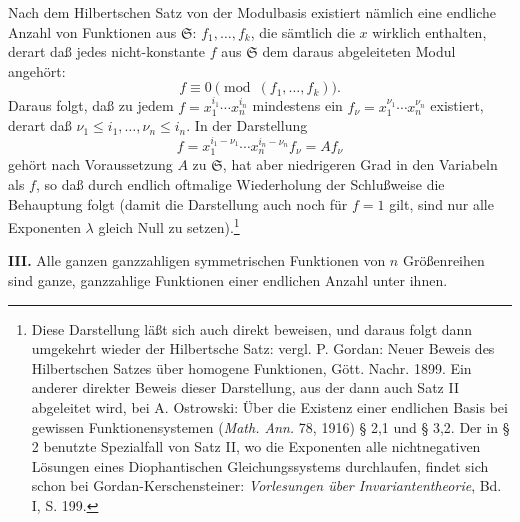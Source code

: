 \documentclass[11pt]{article}
\providecommand{\frS}{\mathfrak S}
\begin{document}
Nach dem Hilbertschen Satz von der Modulbasis existiert nämlich eine endliche Anzahl von Funktionen aus \(\frS\): \(f_1,\ldots,f_k\), die sämtlich die \(x\) wirklich enthalten, derart daß jedes nicht-konstante \(f\) aus \(\frS\) dem daraus abgeleiteten Modul angehört:
\[
        f\equiv0\pmod{(f_1,\ldots,f_k)}.
\]
Daraus folgt, daß zu jedem \(f=x_1^{i_1}\cdots x_n^{i_n}\) mindestens ein \(f_\nu=x_1^{\nu_1}\cdots x_n^{\nu_n}\) existiert, derart daß \(\nu_1\le i_1,\ldots,\nu_n\le i_n\). In der Darstellung
\[
        f=x_1^{i_1-\nu_1}\cdots x_n^{i_n-\nu_n} f_\nu = A f_\nu
\]
gehört nach Voraussetzung \(A\) zu \(\frS\), hat aber niedrigeren Grad in den Variabeln als \(f\), so daß durch endlich oftmalige Wiederholung der Schlußweise die Behauptung folgt (damit die Darstellung auch noch für \(f=1\) gilt, sind nur alle Exponenten \(\lambda\) gleich Null zu setzen).\footnote{Diese Darstellung läßt sich auch direkt beweisen, und daraus folgt dann umgekehrt wieder der Hilbertsche Satz: vergl. P. Gordan: Neuer Beweis des Hilbertschen Satzes über homogene Funktionen, Gött. Nachr. 1899. Ein anderer direkter Beweis dieser Darstellung, aus der dann auch Satz II abgeleitet wird, bei A. Ostrowski: Über die Existenz einer endlichen Basis bei gewissen Funktionensystemen (\emph{Math. Ann.} 78, 1916) § 2,1 und § 3,2. Der in § 2 benutzte Spezialfall von Satz II, wo die Exponenten alle nichtnegativen Lösungen eines Diophantischen Gleichungssystems durchlaufen, findet sich schon bei Gordan-Kerschensteiner: \emph{Vorlesungen über Invariantentheorie}, Bd. I, S. 199.}

\textbf{III.} Alle ganzen ganzzahligen symmetrischen Funktionen von \(n\) Größenreihen sind ganze, ganzzahlige Funktionen einer endlichen Anzahl unter ihnen.
\end{document}

